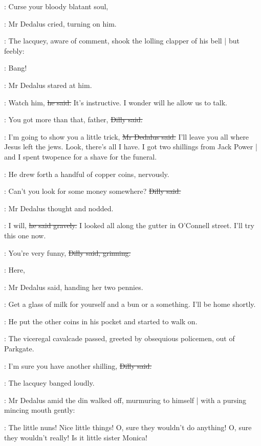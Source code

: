 \simon:
Curse your bloody blatant soul,

:
Mr Dedalus cried,
turning on him.

:
The lacquey,
aware of comment,
shook the lolling clapper of his bell |
but feebly:

\bell:
Bang!

:
Mr Dedalus stared at him.

\simon:
Watch him,
\sout{he said.}
It's instructive.
I wonder will he allow us to talk.

\dilly:
You got more than that, father,
\sout{Dilly said.}

\simon:
I'm going to show you a little trick,
\sout{Mr Dedalus said.}
I'll leave you all where Jesus left the jews.
Look, there's all I have.
I got two shillings from Jack Power |
and I spent twopence for a shave for the funeral.

:
He drew forth a handful of copper coins,
nervously.

\dilly:
Can't you look for some money somewhere?
\sout{Dilly said.}

:
Mr Dedalus thought and nodded.

\simon:
I will,
\sout{he said gravely.}
I looked all along the gutter in O'Connell street.
I'll try this one now.

\dilly:
You're very funny,
\sout{Dilly said, grinning.}

\simon:
Here,

:
Mr Dedalus said,
handing her two pennies.

\simon:
Get a glass of milk for yourself
and a bun or a something.
I'll be home shortly.

:
He put the other coins in his pocket and started to walk on.

\begin{interject}
    :
    The viceregal cavalcade passed,
    greeted by obsequious policemen,
    out of Parkgate.%
\end{interject}

\dilly:
I'm sure you have another shilling,
\sout{Dilly said.}

:
The lacquey banged loudly.

:
Mr Dedalus amid the din walked off,
murmuring to himself |
with a pursing mincing mouth gently:

\simon:
The little nuns!
Nice little things!
O, sure they wouldn't do anything!
O, sure they wouldn't really!
Is it little sister Monica!


